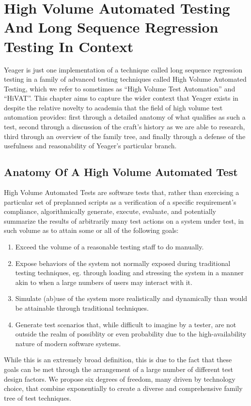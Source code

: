 \chapter{High Volume Automated Testing And Long Sequence Regression Testing In Context}
Yeager is just one implementation of a technique called long sequence regression testing in a family of advanced testing techniques called High Volume Automated Testing, which we refer to sometimes as ``High Volume Test Automation'' and ``HiVAT''. This chapter aims to capture the wider context that Yeager exists in despite the relative novelty to academia that the field of high volume test automation provides: first through a detailed anatomy of what qualifies as such a test, second through a discussion of the craft's history as we are able to research, third through an overview of the family tree, and finally through a defense of the usefulness and reasonability of Yeager's particular branch.

\section{Anatomy Of A High Volume Automated Test}
High Volume Automated Tests are software tests that, rather than exercising a particular set of preplanned scripts as a verification of a specific requirement's compliance, algorithmically generate, execute, evaluate, and potentially summarize the results of arbitrarily many test actions on a system under test, in such volume as to attain some or all of the following goals:
\begin{enumerate}
\item Exceed the volume of a reasonable testing staff to do manually.
\item Expose behaviors of the system not normally exposed during traditional testing techniques, eg. through loading and stressing the system in a manner akin to when a large numbers of users may interact with it.
\item Simulate (ab)use of the system more realistically and dynamically than would be attainable through traditional techniques.
\item Generate test scenarios that, while difficult to imagine by a tester, are not outside the realm of possiblity or even probability due to the high-availability nature of modern software systems.
\end{enumerate}

While this is an extremely broad definition, this is due to the fact that these goals can be met through the arrangement of a large number of different test design factors. We propose six degrees of freedom, many driven by technology choice, that combine exponentially to create a diverse and comprehensive family tree of test techniques.

